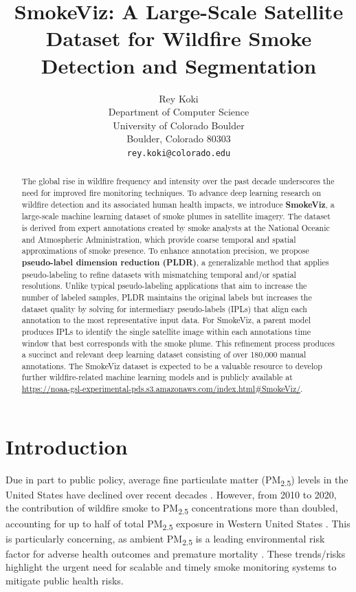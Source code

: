 \documentclass{article}
\title{SmokeViz: A Large-Scale Satellite Dataset for Wildfire Smoke Detection and Segmentation}
\author{%
  Rey Koki\\%
  Department of Computer Science\\
  University of Colorado Boulder\\
  Boulder, Colorado 80303\\
  \texttt{rey.koki@colorado.edu} \\
}
\begin{document}
\maketitle


\begin{abstract}
    The global rise in wildfire frequency and intensity over the past decade underscores the need for improved fire monitoring techniques. To advance deep learning research on wildfire detection and its associated human health impacts, we introduce \textbf{SmokeViz}, a large-scale machine learning dataset of smoke plumes in satellite imagery. The dataset is derived from expert annotations created by smoke analysts at the National Oceanic and Atmospheric Administration, which provide coarse temporal and spatial approximations of smoke presence. To enhance annotation precision, we propose \textbf{pseudo-label dimension reduction (PLDR)}, a generalizable method that applies pseudo-labeling to refine datasets with mismatching temporal and/or spatial resolutions. Unlike typical pseudo-labeling applications that aim to increase the number of labeled samples, PLDR maintains the original labels but increases the dataset quality by solving for intermediary pseudo-labels (IPLs) that align each annotation to the most representative input data. For SmokeViz, a parent model produces IPLs to identify the single satellite image within each annotations time window that best corresponds with the smoke plume. This refinement process produces a succinct and relevant deep learning dataset consisting of over 180,000 manual annotations. The SmokeViz dataset is expected to be a valuable resource to develop further wildfire-related machine learning models and is publicly available at \url{https://noaa-gsl-experimental-pds.s3.amazonaws.com/index.html#SmokeViz/}.
\end{abstract}


\section{Introduction}

Due in part to public policy, average fine particulate matter (PM\textsubscript{2.5}) levels in the United States have declined over recent decades \cite{clean_air_act}. However, from 2010 to 2020, the contribution of wildfire smoke to PM\textsubscript{2.5} concentrations more than doubled, accounting for up to half of total PM\textsubscript{2.5} exposure in Western United States \cite{smoke_PM}. This is particularly concerning, as ambient PM\textsubscript{2.5} is a leading environmental risk factor for adverse health outcomes and premature mortality \cite{smoke_mortality}. These trends/risks highlight the urgent need for scalable and timely smoke monitoring systems to mitigate public health risks.
\end{document}
